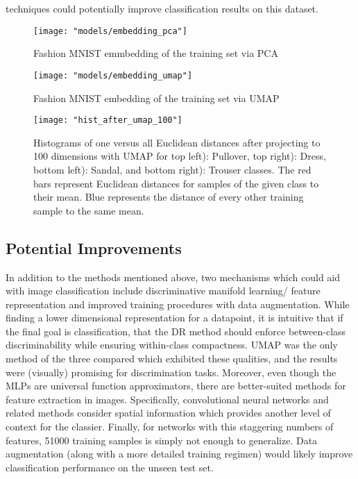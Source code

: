 \documentclass[conference]{IEEEtran}
\begin{document}
techniques could potentially improve classification results on this dataset.

\begin{center}
	\begin{figure}[t]
		\centering
		\texttt{[image: "models/embedding\_pca"]}
		\caption{Fashion MNIST emmbedding of the training set via PCA}
		\label{fig:pca_embedding}
	\end{figure}
\end{center}

\begin{center}
	\begin{figure}[t]
		\centering
		\texttt{[image: "models/embedding\_umap"]}
		\caption{Fashion MNIST embedding of the training set via UMAP}
		\label{fig:umap_embedding}
	\end{figure}
\end{center}

 \begin{center}
	\begin{figure}[t]
		\centering
		\texttt{[image: "hist\_after\_umap\_100"]}
		\caption{Histograms of one versus all Euclidean distances after projecting to 100 dimensions with UMAP for top left): Pullover, top right): Dress, bottom left): Sandal, and bottom right): Trouser classes.  The red bars represent Euclidean distances for samples of the given class to their mean.  Blue represents the distance of every other training sample to the same mean.}
		\label{fig:hist_after_umap_100}
	\end{figure}
\end{center}

\subsection{Potential Improvements}
In addition to the methods mentioned above, two mechanisms which could aid with image classification include discriminative manifold learning/ feature representation and improved training procedures with data augmentation.  While finding a lower dimensional representation for a datapoint, it is intuitive that if the final goal is classification, that the DR method should enforce between-class discriminability while ensuring within-class compactness.  UMAP was the only method of the three compared which exhibited these qualities, and the results were (visually) promising for discrimination tasks.  Moreover, even though the MLPs are universal function approximators, there are better-suited methods for feature extraction in images.  Specifically, convolutional neural networks and related methods consider spatial information which provides another level of context for the classier. Finally, for networks with this staggering numbers of features, 51000 training samples is simply not enough to generalize.  Data augmentation (along with a more detailed training regimen) would likely improve classification performance on the unseen test set.
\end{document}
